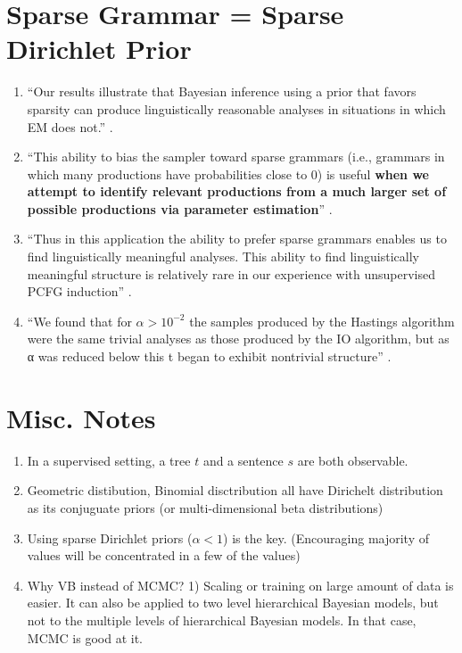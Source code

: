 \documentclass[11pt]{article}
\begin{document}
\section{Sparse Grammar = Sparse Dirichlet Prior}
\begin{enumerate}
 \item ``Our results illustrate that Bayesian inference using a prior that favors sparsity can produce linguistically reasonable analyses in situations in which EM does not.'' \cite{johnson-griffiths-goldwater:2007:main}.
 \item ``This ability to bias the sampler toward sparse grammars (i.e., grammars in which many productions have probabilities close to 0) is useful {\bf when we attempt to identify relevant productions from a much larger set of possible productions via parameter estimation}'' \cite{johnson-griffiths-goldwater:2007:main}.
 \item ``Thus in this application the ability to prefer sparse grammars enables us to find linguistically meaningful analyses. This ability to find linguistically meaningful structure is relatively rare in our experience with unsupervised PCFG induction'' \cite{johnson-griffiths-goldwater:2007:main}.
 \item ``We found that for $\alpha > 10^{-2}$ the samples produced by the Hastings algorithm were the same trivial analyses as those produced by the IO algorithm, but as α was reduced below this t began to exhibit nontrivial structure'' \cite{johnson-griffiths-goldwater:2007:main}.
\end{enumerate}


\section{Misc. Notes}
\begin{enumerate}
 \item In a supervised setting, a tree $t$ and a sentence $s$ are both observable.
 \item Geometric distibution, Binomial disctribution all have Dirichelt distribution as its conjuguate priors (or multi-dimensional beta distributions)
 \item Using sparse Dirichlet priors ($\alpha < 1$) is the key. (Encouraging majority of values will be concentrated in a few of the values)
 \item Why VB instead of MCMC? 1) Scaling or training on large amount of data is easier. It can also be applied to two level hierarchical Bayesian models, but not to the multiple levels of hierarchical Bayesian models. In that case, MCMC is good at it.
\end{enumerate}
\end{document}
